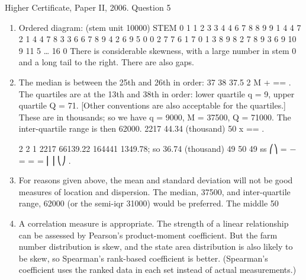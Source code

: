 \documentclass[a4paper,12pt]{article}
\begin{document}
Higher Certificate, Paper II, 2006.  Question 5 
\begin{enumerate} 
\item  Ordered diagram: (stem unit 10000) 
          STEM    0  1 1 2 3 3 4 4 6 7 8 8 9 9    1  4 4 7    2  1 4 4 7 8    3  3 6 6 7 8 9    4  2 6 9    5  0 0 2 7 7    6  1    7  0 1 3 8 9    8  2 7 8    9  3 6 9  10  9  11  5  …   16  0 
 There is considerable skewness, with a large number in stem 0 and a long tail to the right.  There are also gaps. 
\item  The median is between the 25th and 26th in order:  37 38 37.5 2 M + == . 
 The quartiles are at the 13th and 38th in order:  lower quartile q = 9, upper quartile Q = 71.  [Other conventions are also acceptable for the quartiles.] 
 These are in thousands;  so we have q = 9000, M = 37500, Q = 71000.  The inter-quartile range is then 62000. 
  2217 44.34 (thousand) 50 x == . 
 
 
2 2 1 2217 66139.22 164441 1349.78; so 36.74 (thousand) 49 50 49 ss ⎛⎞ = − = = = ⎜⎟ ⎝⎠ . 
 
 
\item  For reasons given above, the mean and standard deviation will not be good measures of location and dispersion.  The median, 37500, and inter-quartile range, 62000 (or the semi-iqr 31000) would be preferred. 
 The middle 50%
 
 
\item  A correlation measure is appropriate.  The strength of a linear relationship can be assessed by Pearson's product-moment coefficient.  But the farm number distribution is skew, and the state area distribution is also likely to be skew, so Spearman's rank-based coefficient is better.  (Spearman's coefficient uses the ranked data in each set instead of actual measurements.) 
\end{enumerate}
\end{document}
